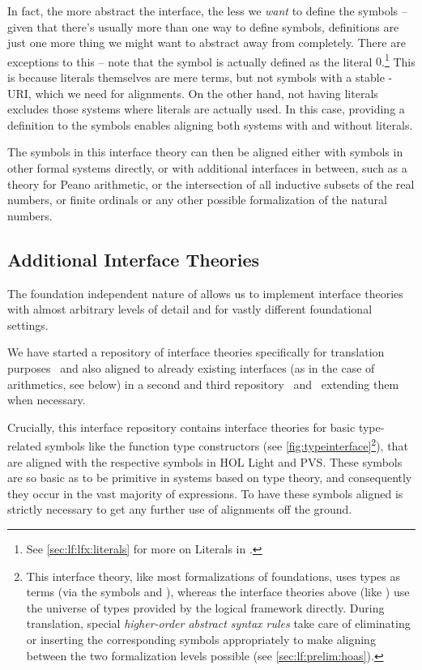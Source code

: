  In fact, the more abstract the interface, the less we \emph{want} to define the symbols -- given that there's usually more than one way to define symbols, definitions are just one more thing we might want to abstract away from completely. There are exceptions to this -- note that the symbol  is actually defined as the literal $0$.\footnote{See \autoref{sec:lf:lfx:literals} for more on Literals in \mmt.} This is because literals themselves are mere \mmt terms, but not symbols with a stable \mmt-URI, which we need for alignments. On the other hand, not having literals excludes those systems where literals are actually used. In this case, providing a definition to the symbols enables aligning both systems with and without literals.\medskip
 
 The symbols in this interface theory can then be aligned either with symbols in other formal systems directly, or with additional interfaces in between, such as a theory for Peano arithmetic, or the intersection of all inductive subsets of the real numbers, or finite ordinals or any other possible formalization of the natural numbers.

\subsection{Additional Interface Theories}\label{subsec:crosslib:interfaces}

The foundation independent nature of \mmt allows us to implement interface theories with almost arbitrary levels of detail and for vastly different foundational settings.

We have started a repository of interface theories specifically for translation purposes~\cite{MitMInter:on} and also aligned to already existing interfaces (as in the case of arithmetics, see below) in a second and third \mathhub repository~\cite{mitm:smglom:on} and~\cite{mitm:foundation:on} extending them when necessary. \medskip

Crucially, this interface repository contains interface theories for basic type-related symbols like the function type constructors (see \autoref{fig:typeinterface}\footnote{This interface theory, like most formalizations of foundations, uses types as terms (via the symbols  and ), whereas the interface theories above (like ) use the universe of types provided by the logical framework directly. During translation, special \emph{higher-order abstract syntax rules} take care of eliminating or inserting the corresponding symbols appropriately to make aligning between the two formalization levels possible (see \autoref{sec:lf:prelim:hoas}).}), that are aligned with the respective symbols in HOL Light and PVS. These symbols are so basic as to be primitive in systems based on type theory, and consequently they occur in the vast majority of expressions. To have these symbols aligned is strictly necessary to get any further use of alignments off the ground.

